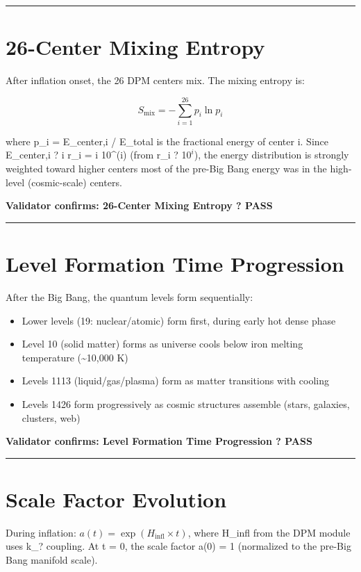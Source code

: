\documentclass[12pt,a4paper]{article}
\begin{document}
\medskip\hrule\medskip

\section{26-Center Mixing Entropy}

After inflation onset, the 26 DPM centers mix. The mixing entropy is:

\begin{equation}
S_{\mathrm{mix}} = -\sum_{i=1}^{26} p_i \ln p_i
\end{equation}

where p\_i = E\_{center,i} / E\_total is the fractional energy of center i. Since E\_center,i ? i  r\_i = i  10\^{}(i) (from r\_i ? 1$0^{i}$), the energy distribution is strongly weighted toward higher centers most of the pre-Big Bang energy was in the high-level (cosmic-scale) centers.

\textbf{Validator confirms: 26-Center Mixing Entropy ? PASS}

\medskip\hrule\medskip

\section{Level Formation Time Progression}

After the Big Bang, the quantum levels form sequentially:

\begin{itemize}
  \item Lower levels (19: nuclear/atomic) form first, during early hot dense phase
  \item Level 10 (solid matter) forms as universe cools below iron melting temperature (\textasciitilde{}10,000 K)
  \item Levels 1113 (liquid/gas/plasma) form as matter transitions with cooling
  \item Levels 1426 form progressively as cosmic structures assemble (stars, galaxies, clusters, web)
\end{itemize}

\textbf{Validator confirms: Level Formation Time Progression ? PASS}

\medskip\hrule\medskip

\section{Scale Factor Evolution}

During inflation: $a(t) = \exp(H_{\mathrm{infl}} \times t)$, where H\_infl from the DPM module uses k\_? coupling. At t = 0, the scale factor a(0) = 1 (normalized to the pre-Big Bang manifold scale).
\end{document}
